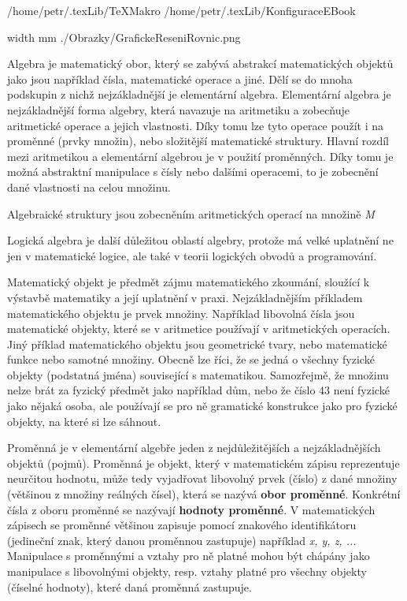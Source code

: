 \def\addr{/home/petr/.texLib}
 \addr/TeXMakro
\setAddress{\addr}
 \addr/KonfiguraceEBook


\pdfximage width \the\SirkaOdstavce mm {./Obrazky/GrafickeReseniRovnic.png}




\Obsah


Algebra je matematický obor, který se zabývá abstrakcí matematických objektů jako jsou například čísla, matematické operace a jiné. Dělí se do mnoha podskupin z nichž nejzákladnější je elementární algebra. Elementární algebra je nejzákladnější forma algebry, která navazuje na aritmetiku a zobecňuje aritmetické operace a jejich vlastnosti. Díky tomu lze tyto operace použít i na proměnné (prvky množin), nebo složitější matematické struktury. Hlavní rozdíl mezi aritmetikou a elementární algebrou je v použití proměnných. Díky tomu je možná abstraktní manipulace s čísly nebo dalšími operacemi, to je zobecnění dané vlastnosti na celou množinu.

Algebraické struktury jsou zobecněním aritmetických operací na množině {\it M}

Logická algebra je další důležitou oblastí algebry, protože má velké uplatnění ne jen v matematické logice, ale také v teorii logických obvodů a programování.


Matematický objekt je předmět zájmu matematického zkoumání, sloužící k výstavbě matematiky a její uplatnění v praxi. Nejzákladnějším příkladem matematického objektu je prvek množiny. Například libovolná čísla jsou matematické objekty, které se v aritmetice používají v aritmetických operacích. Jiný příklad matematického objektu jsou geometrické tvary, nebo matematické funkce nebo samotné množiny. Obecně lze říci, že se jedná o všechny fyzické objekty (podstatná jména) související s matematikou. Samozřejmě, že množinu nelze brát za fyzický předmět jako například dům, nebo že číslo 43 není fyzické jako nějaká osoba, ale používají se pro ně gramatické konstrukce jako pro fyzické objekty, na které si lze sáhnout.


Proměnná je v elementární algebře jeden z nejdůležitějších a nejzákladnějších objektů (pojmů). Proměnná je objekt, který v matematickém zápisu reprezentuje neurčitou hodnotu, může tedy vyjadřovat libovolný prvek (číslo) z dané množiny (většinou z množiny reálných čísel), která se nazývá {\bf obor proměnné}. Konkrétní čísla z oboru proměnné se nazývají {\bf hodnoty proměnné}. V matematických zápisech se proměnné většinou zapisuje pomocí znakového identifikátoru (jedineční znak, který danou proměnnou zastupuje) například {\it x, y, z, ...} Manipulace s proměnnými a vztahy pro ně platné mohou být chápány jako manipulace s libovolnými objekty, resp. vztahy platné pro všechny objekty (číselné hodnoty), které daná proměnná zastupuje.

